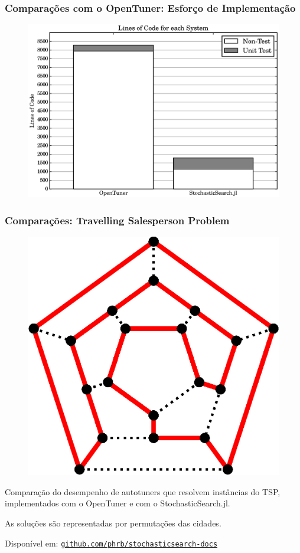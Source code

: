 \documentclass[10pt, compress]{beamer}
\begin{document}
\begin{frame}[fragile]
    \frametitle{Comparações com o OpenTuner: Esforço de Implementação}
    \begin{figure}[H]
        \centering
        \includegraphics[width=1\textwidth]{loc_comparison}
    \end{figure}%
\end{frame}

\begin{frame}[fragile]
    \frametitle{Comparações: Travelling Salesperson Problem}
    \begin{figure}[H]
        \centering
        \includegraphics[width=.28\textwidth]{hamiltonianpath}
    \end{figure}%
    Comparação do desempenho de \alert{autotuners} que resolvem
    instâncias\footnotemark{} do TSP, implementados com o OpenTuner e 
    com o StochasticSearch.jl.
    \pause

    As soluções são representadas por \alert{permutações} das cidades.

    \pause
    Disponível em:
    \href{https://github.com/phrb/stochasticsearch-docs}{\tt github.com/phrb/stochasticsearch-docs}

\end{frame}
\end{document}
